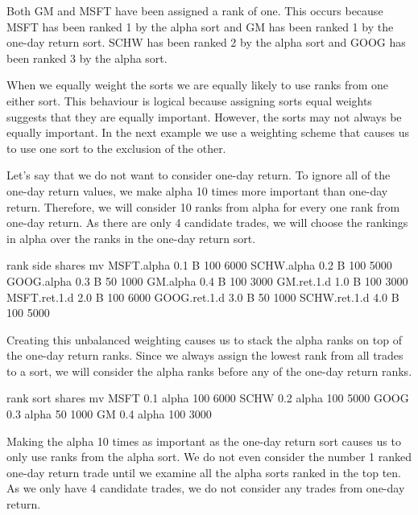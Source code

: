 \documentclass{article}
\begin{document}
Both GM and MSFT have been assigned a rank of one.  This occurs
because MSFT has been ranked 1 by the alpha sort and GM has been
ranked 1 by the one-day return sort.  SCHW has been ranked 2 by the
alpha sort and GOOG has been ranked 3 by the alpha sort.

When we equally weight the sorts we are equally likely to use ranks
from one either sort.  This behaviour is logical because
assigning sorts equal weights suggests that they are equally
important.  However, the sorts may not always be equally important.
In the next example we use a weighting scheme that causes us to use
one sort to the exclusion of the other.

Let's say that we do not want to consider one-day return.  To ignore
all of the one-day return values, we make alpha 10 times more
important than one-day return.  Therefore, we will consider 10 ranks
from alpha for every one rank from one-day return.  As there are only
4 candidate trades, we will choose the
rankings in alpha over the ranks in the one-day return sort.

\begin{Schunk}
\begin{Soutput}
             rank side shares   mv
MSFT.alpha    0.1    B    100 6000
SCHW.alpha    0.2    B    100 5000
GOOG.alpha    0.3    B     50 1000
GM.alpha      0.4    B    100 3000
GM.ret.1.d    1.0    B    100 3000
MSFT.ret.1.d  2.0    B    100 6000
GOOG.ret.1.d  3.0    B     50 1000
SCHW.ret.1.d  4.0    B    100 5000
\end{Soutput}
\end{Schunk}

Creating this unbalanced weighting causes us to stack the alpha ranks
on top of the one-day return ranks.  Since we always assign the lowest
rank from all trades to a sort, we will consider the alpha ranks
before any of the one-day return ranks.

\begin{Schunk}
\begin{Soutput}
     rank  sort shares   mv
MSFT  0.1 alpha    100 6000
SCHW  0.2 alpha    100 5000
GOOG  0.3 alpha     50 1000
GM    0.4 alpha    100 3000
\end{Soutput}
\end{Schunk}

Making the alpha 10 times as important as the one-day return sort
causes us to only use ranks from the alpha sort.  We do not even
consider the number 1 ranked one-day return trade until we examine all
the alpha sorts ranked in the top ten.  As we only have 4 candidate
trades, we do not consider any trades from one-day return.
\end{document}
